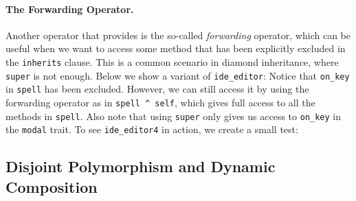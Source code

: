 \paragraph{The Forwarding Operator.}
Another operator that \sedel provides is the so-called \emph{forwarding}
operator, which can be useful when we want to access some method that has been
explicitly excluded in the \lstinline{inherits} clause. This is a common scenario in
diamond inheritance, where \lstinline{super} is not enough. Below we show a
variant of \lstinline{ide_editor}:
Notice that \lstinline{on_key} in \lstinline{spell} has been
excluded. However, we can
still access it by using the forwarding operator as in \lstinline{spell ^ self},
which gives full access to all the methods in \lstinline{spell}. Also note that
using \lstinline{super} only gives us access to \lstinline{on_key} in the
\lstinline{modal} trait. To see \lstinline{ide_editor4} in action, we create a
small test:




\subsection{Disjoint Polymorphism and Dynamic Composition}
\label{sec:merge}


